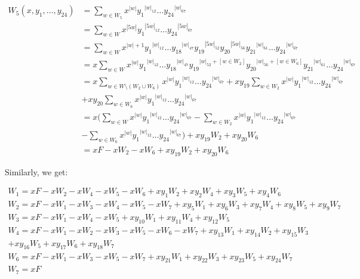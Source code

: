 \documentclass[12pt]{report}
\begin{document}
{{\begin{align*}
W_5(x,y_1,\ldots,y_{24}) &= \sum\limits_{w \in W_5}x^{|w|} {y_1}^{|w|_{12}} \ldots {y_{24}}^{|w|_{67}} \\
&= \sum\limits_{w \in W}x^{|5w|} {y_1}^{|5w|_{12}} \ldots {y_{24}}^{|5w|_{67}} \\
&= \sum\limits_{w \in W}x^{|w|+1} {y_1}^{|w|_{12}} \ldots {y_{18}}^{|w|_{47}} {y_{19}}^{|5w|_{52}} {y_{20}}^{|5w|_{56}} {y_{21}}^{|w|_{61}} \ldots {y_{24}}^{|w|_{67}} \\
&= x \sum\limits_{w \in W}x^{|w|} {y_1}^{|w|_{12}} \ldots {y_{18}}^{|w|_{47}} {y_{19}}^{|w|_{52}+[w \in W_2]} {y_{20}}^{|w|_{56} + [w \in W_6]} {y_{21}}^{|w|_{61}} \ldots {y_{24}}^{|w|_{67}} \\
&= x \sum\limits_{w \in W \setminus (W_2 \cup W_6)}x^{|w|} {y_1}^{|w|_{12}} \ldots {y_{24}}^{|w|_{67}} + x y_{19} \sum\limits_{w \in W_2}x^{|w|} {y_1}^{|w|_{12}} \ldots {y_{24}}^{|w|_{67}} \\
&+ x y_{20} \sum\limits_{w \in W_6}x^{|w|} {y_1}^{|w|_{12}} \ldots {y_{24}}^{|w|_{67}} \\
&= x \big( \sum\limits_{w \in W}x^{|w|} {y_1}^{|w|_{12}} \ldots {y_{24}}^{|w|_{67}} - \sum\limits_{w \in W_2}x^{|w|} {y_1}^{|w|_{12}} \ldots {y_{24}}^{|w|_{67}} \\
&- \sum\limits_{w \in W_6}x^{|w|} {y_1}^{|w|_{12}} \ldots {y_{24}}^{|w|_{67}} \big) + x y_{19} W_2 + x y_{20} W_6 \\
&= x F - x W_2 - x W_6 + x y_{19} W_2 + x y_{20} W_6 
\end{align*}

\noindent Similarly, we get:

\begin{gather*}
W_1 = x F - x W_2 - x W_4 - x W_5 - x W_6 + x y_1 W_2 + x y_2 W_4 + x y_3 W_5 + x y_4 W_6 \\ 
W_2 = x F - x W_1 - x W_3 - x W_4 - x W_5 - x W_7 + x y_5 W_1 + x y_6 W_3 + x y_7 W_4 + x y_8 W_5 + x y_9 W_7\\ 
W_3 = x F - x W_1 - x W_4 - x W_5 + x y_{10} W_1 + x y_{11} W_4 + x y_{12} W_5 \\
W_4 = x F - x W_1 - x W_2 - x W_3 - x W_5 - x W_6 - x W_7 + x y_{13} W_1 + x y_{14} W_2 + x y_{15} W_3 \\ + x y_{16} W_5 + x y_{17} W_6 + x y_{18} W_7 \\
W_6 = x F - x W_1 - x W_3 - x W_5 - x W_7 + x y_{21} W_1 + x y_{22} W_3 + x y_{23} W_5 + x y_{24} W_7 \\
W_7= x F
\end{gather*}

}}
\end{document}
